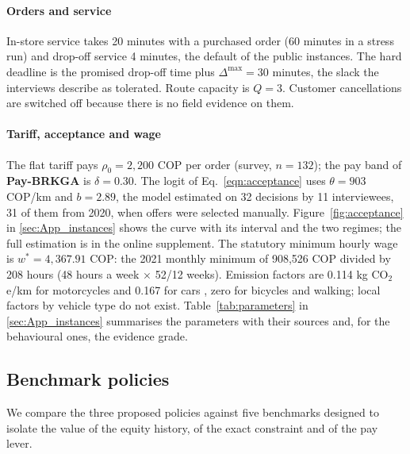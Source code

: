 \documentclass[a4paper,11pt,review,3p,authoryear]{elsarticle}
\begin{document}
\paragraph{Orders and service} In-store service takes 20 minutes with a purchased order (60 minutes in a stress run) and drop-off service 4 minutes, the default of the public instances. The hard deadline is the promised drop-off time plus $\Delta^{\max} = 30$ minutes, the slack the interviews describe as tolerated. Route capacity is $Q = 3$. Customer cancellations are switched off because there is no field evidence on them.

\paragraph{Tariff, acceptance and wage} The flat tariff pays $\rho_0 = 2{,}200$ COP per order (survey, $n = 132$); the pay band of \textbf{Pay-BRKGA} is $\delta = 0.30$. The logit of Eq.~\eqref{eqn:acceptance} uses $\theta = 903$ COP/km and $b = 2.89$, the model estimated on 32 decisions by 11 interviewees, 31 of them from 2020, when offers were selected manually. Figure~\ref{fig:acceptance} in \ref{sec:App_instances} shows the curve with its interval and the two regimes; the full estimation is in the online supplement. The statutory minimum hourly wage is $w^* = 4{,}367.91$ COP: the 2021 monthly minimum of 908{,}526 COP \citep{colombia2021smmlv} divided by 208 hours (48 hours a week $\times$ 52/12 weeks). Emission factors are 0.114 kg CO$_2$e/km for motorcycles and 0.167 for cars \citep{defra2023factors}, zero for bicycles and walking; local factors by vehicle type do not exist. Table~\ref{tab:parameters} in \ref{sec:App_instances} summarises the parameters with their sources and, for the behavioural ones, the evidence grade.

\subsection{Benchmark policies}
\label{sec:Benchmark}

We compare the three proposed policies against five benchmarks designed to isolate the value of the equity history, of the exact constraint and of the pay lever.
\end{document}
